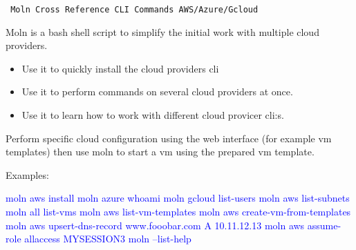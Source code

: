 \documentclass{article}
\begin{document}
\tt
    {\Large Moln Cross Reference CLI Commands AWS/Azure/Gcloud}

    Moln is a bash shell script to simplify the initial work with multiple cloud providers.

    \begin{itemize}
    \item{Use it to quickly install the cloud providers cli}
    \item{Use it to perform commands on several cloud providers at once.}
    \item{Use it to learn how to work with different cloud provicer cli:s.}
    \end{itemize}

    Perform specific cloud configuration using the web interface (for example vm templates)
    then use moln to start a vm using the prepared vm template.

    Examples:

    \textcolor{Blue}{moln aws install} \linebreak
    \textcolor{Blue}{moln azure whoami} \linebreak
    \textcolor{Blue}{moln gcloud list-users} \linebreak
    \textcolor{Blue}{moln aws list-subnets} \linebreak
    \textcolor{Blue}{moln all list-vms} \linebreak
    \textcolor{Blue}{moln aws list-vm-templates} \linebreak
    \textcolor{Blue}{moln aws create-vm-from-templates} \linebreak
    \textcolor{Blue}{moln aws upsert-dns-record www.fooobar.com A 10.11.12.13} \linebreak
    \textcolor{Blue}{moln aws assume-role allaccess MYSESSION3} \linebreak
    \textcolor{Blue}{moln --list-help} \linebreak
    \par
\end{document}
